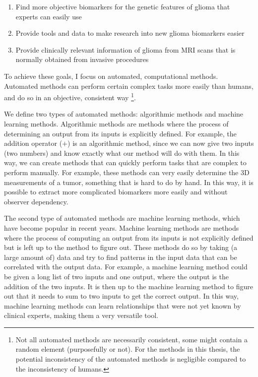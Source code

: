 \begin{enumerate}
\item Find more objective biomarkers for the genetic features of \gls{glioma} that experts can easily use
\item Provide tools and data to make research into new glioma biomarkers easier
\item Provide clinically relevant information of glioma from \gls{MRI} scans that is normally obtained from invasive procedures
\end{enumerate}

To achieve these goals, I focus on automated, computational methods.
Automated methods can perform certain complex tasks more easily than humans, and do so in an objective, consistent way \footnote{Not all automated methods are necessarily consistent, some might contain a random element (purposefully or not). For the methods in this thesis, the potential inconsistency of the automated methods is negligible compared to the inconsistency of humans.}.

We define two types of automated methods: algorithmic methods and machine learning methods.
Algorithmic methods are methods where the process of determining an output from its inputs is explicitly defined.
For example, the addition operator ($+$) is an algorithmic method, since we can now give two inputs (two numbers) and know exactly what our method will do with them.
In this way, we can create methods that can quickly perform tasks that are complex to perform manually.
For example, these methods can very easily determine the 3D measurements of a \gls{tumor}, something that is hard to do by hand.
In this way, it is possible to extract more complicated biomarkers more easily and without observer dependency.

The second type of automated methods are machine learning methods, which have become popular in recent years.
Machine learning methods are methods where the process of computing an output from its inputs is not explicitly defined but is left up to the method to figure out.
These methods do so by taking (a large amount of) data and try to find patterns in the input data that can be correlated with the output data.
For example, a machine learning method could be given a long list of two inputs and one output, where the output is the addition of the two inputs.
It is then up to the machine learning method to figure out that it needs to sum to two inputs to get the correct output.
In this way, machine learning methods can learn relationships that were not yet known by clinical experts, making them a very versatile tool.

